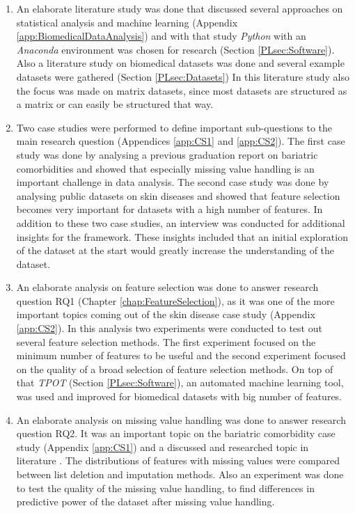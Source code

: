 \documentclass[10pt,a4paper]{report}
\begin{document}
	\begin{enumerate}
		\item An elaborate literature study was done that discussed several approaches on statistical analysis and machine learning (Appendix \ref{app:BiomedicalDataAnalysis}) and with that study \textit{Python} with an \textit{Anaconda} environment was chosen for research (Section \ref{PLsec:Software}). Also a literature study on biomedical datasets was done and several example datasets were gathered (Section \ref{PLsec:Datasets}) In this literature study also the focus was made on matrix datasets, since most datasets are structured as a matrix or can easily be structured that way.
		
		\item Two case studies were performed to define important sub-questions to the main research question (Appendices \ref{app:CS1} and \ref{app:CS2}). The first case study was done by analysing a previous graduation report on bariatric comorbidities \cite{Deneer2017Thesis} and showed that especially missing value handling is an important challenge in data analysis. The second case study was done by analysing public datasets on skin diseases \cite{nair2009genome, suarez2012expanding, bigler2013cross, kim2016spectrum, yao2008type, suarez2011nonlesional, tintle2011reversal, gittler2012progressive} and showed that feature selection becomes very important for datasets with a high number of features. In addition to these two case studies, an interview was conducted for additional insights for the framework. These insights included that an initial exploration of the dataset at the start would greatly increase the understanding of the dataset.
		
		\item An elaborate analysis on feature selection was done to answer research question RQ1 (Chapter \ref{chap:FeatureSelection}), as it was one of the more important topics coming out of the skin disease case study (Appendix \ref{app:CS2}). In this analysis two experiments were conducted to test out several feature selection methods. The first experiment focused on the minimum number of features to be useful and the second experiment focused on the quality of a broad selection of feature selection methods. On top of that \textit{TPOT} (Section \ref{PLsec:Software}), an automated machine learning tool, was used and improved for biomedical datasets with big number of features.
		
		\item An elaborate analysis on missing value handling was done to answer research question RQ2. It was an important topic on the bariatric comorbidity case study (Appendix \ref{app:CS1}) and a discussed and researched topic in literature \cite{CIOS20021, Yoo2012}. The distributions of features with missing values were compared between list deletion and imputation methods. Also an experiment was done to test the quality of the missing value handling, to find differences in predictive power of the dataset after missing value handling.
		

\end{enumerate}
\end{document}
